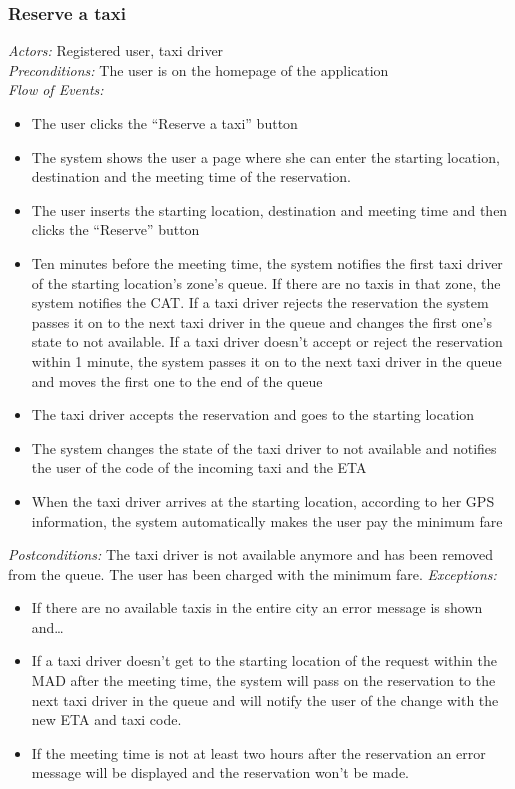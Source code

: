 \documentclass{article}
\begin{document}
	\subsubsection{Reserve a taxi}
	\textit{Actors:} Registered user, taxi driver
	\\\textit{Preconditions:} The user is on the homepage of the application %
	\\\textit{Flow of Events:}
	\begin{itemize}
		\item  The user clicks the ``Reserve a taxi'' button
		\item  The system shows the user a page where she can enter the starting location, destination and the meeting time of the reservation.
		\item  The user inserts the starting location, destination and meeting time and then clicks the ``Reserve'' button
		\item  Ten minutes before the meeting time, the system notifies the first taxi driver of the starting location's zone's queue. If there are no taxis in that zone, the system notifies the CAT\@. If a taxi driver rejects the reservation the system passes it on to the next taxi driver in the queue and changes the first one's state to not available. If a taxi driver doesn't accept or reject the reservation within 1 minute, the system passes it on to the next taxi driver in the queue and moves the first one to the end of the queue
		\item  The taxi driver accepts the reservation and goes to the starting location
		\item  The system changes the state of the taxi driver to not available and notifies the user of the code of the incoming taxi and the ETA
		\item  When the taxi driver arrives at the starting location, according to her GPS information, the system automatically makes the user pay the minimum fare
	\end{itemize}
	\textit{Postconditions:} The taxi driver is not available anymore and has been removed from the queue. The user has been charged with the minimum fare. %
	\textit{Exceptions:}
	\begin{itemize} 
		\item If there are no available taxis in the entire city an error message is shown and\ldots %
		\item If a taxi driver doesn't get to the starting location of the request within the MAD after the meeting time, the system will pass on the reservation to the next taxi driver in the queue and will notify the user of the change with the new ETA and taxi code.
		\item If the meeting time is not at least two hours after the reservation an error message will be displayed and the reservation won't be made.
	\end{itemize}
	\clearpage
\end{document}
